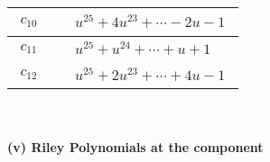 \documentclass[1p]{elsarticle_modified}
\theoremstyle{definition}
\begin{document}
\begin{tabular}{m{50pt}|m{274pt}}
\hline $$\begin{aligned}c_{10}\end{aligned}$$&$\begin{aligned}
&u^{25}+4 u^{23}+\cdots-2 u-1
\end{aligned}$\\
\hline $$\begin{aligned}c_{11}\end{aligned}$$&$\begin{aligned}
&u^{25}+u^{24}+\cdots+u+1
\end{aligned}$\\
\hline $$\begin{aligned}c_{12}\end{aligned}$$&$\begin{aligned}
&u^{25}+2 u^{23}+\cdots+4 u-1
\end{aligned}$\\
\hline
\end{tabular}\\~\\
\newpage\renewcommand{\arraystretch}{1}
\flushleft \textbf{(v) Riley Polynomials at the component}\newline \\
\end{document}
